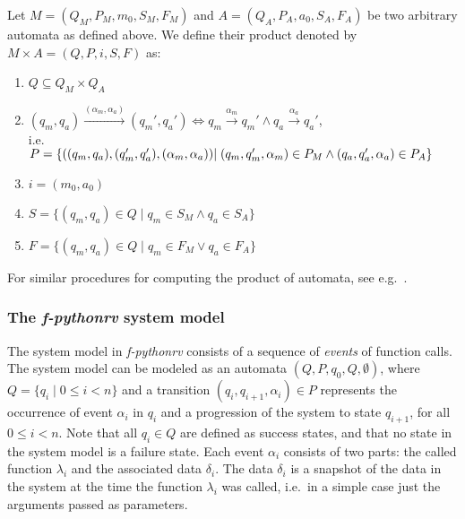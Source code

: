 \begin{mydef}
Let $M = (Q_M,P_M,m_0,S_M,F_M)$ and $A = (Q_A,P_A,a_0,S_A,F_A)$ be two
arbitrary automata as defined above. We define their product denoted by $M
\times A = (Q,P,i,S,F)$ as:

\begin{enumerate}
  \item $Q \subseteq Q_M \times Q_A$
  \item $(q_m,q_a) \xrightarrow{(\alpha_m,\alpha_a)} (q_m',q_a')
    \Leftrightarrow q_m \xrightarrow{\alpha_m} q_m' \wedge q_a \xrightarrow{\alpha_a} q_a'$,\\
    i.e.\\
    $P = \{((q_m,q_a),(q_m',q_a'),(\alpha_m,\alpha_a)) \\
    | \; (q_m,q_m',\alpha_m) \in P_M \wedge (q_a,q_a',\alpha_a) \in P_A\}$
  \item $i = (m_0,a_0)$
  \item $S = \{(q_m,q_a) \in Q \; | \; q_m \in S_M \wedge q_a \in S_A\}$
  \item $F = \{(q_m,q_a) \in Q \; | \; q_m \in F_M \vee q_a \in F_A\}$
\end{enumerate}

\end{mydef}

For similar procedures for computing the product of automata, see e.g.\
\cite{chaki04lks, schneider04kripke}.

\subsubsection{The \textit{f-pythonrv} system model}

The system model in \textit{f-pythonrv} consists of a sequence of
\textit{events} of function calls. The system model can be modeled as an
automata $(Q, P, q_0, Q, \emptyset)$, where $Q = \{q_i \; | \; 0 \leq i < n\}$
and a transition $(q_i, q_{i+1}, \alpha_i) \in P$ represents the occurrence of
event $\alpha_i$ in $q_i$ and a progression of the system to state $q_{i+1}$,
for all $0 \leq i < n$. Note that all $q_i \in  Q$ are defined as success
states, and that no state in the system model is a failure state. Each event
$\alpha_i$ consists of two parts: the called function $\lambda_i$ and the
associated data $\delta_i$. The data $\delta_i$ is a snapshot of the data in
the system at the time the function $\lambda_i$ was called, i.e.\ in a simple
case just the arguments passed as parameters.

